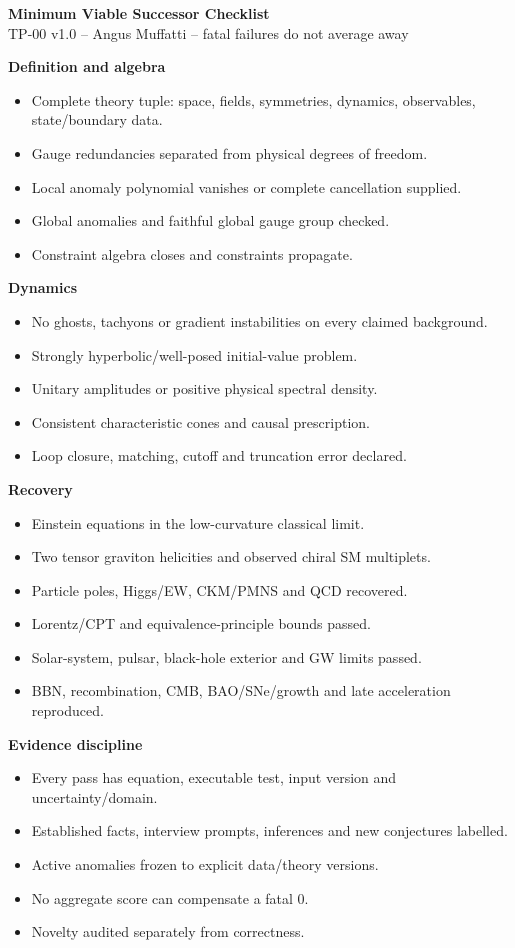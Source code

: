 \documentclass[9pt,a4paper]{article}
\begin{document}
\begin{center}{\Large\bfseries Minimum Viable Successor Checklist}\\[1mm]
{\small TP-00 v1.0 -- Angus Muffatti -- fatal failures do not average away}\end{center}
\begin{minipage}[t]{.48\linewidth}
\textbf{Definition and algebra}
\begin{itemize}
\item Complete theory tuple: space, fields, symmetries, dynamics, observables, state/boundary data.
\item Gauge redundancies separated from physical degrees of freedom.
\item Local anomaly polynomial vanishes or complete cancellation supplied.
\item Global anomalies and faithful global gauge group checked.
\item Constraint algebra closes and constraints propagate.
\end{itemize}
\textbf{Dynamics}
\begin{itemize}
\item No ghosts, tachyons or gradient instabilities on every claimed background.
\item Strongly hyperbolic/well-posed initial-value problem.
\item Unitary amplitudes or positive physical spectral density.
\item Consistent characteristic cones and causal prescription.
\item Loop closure, matching, cutoff and truncation error declared.
\end{itemize}
\end{minipage}\hfill
\begin{minipage}[t]{.48\linewidth}
\textbf{Recovery}
\begin{itemize}
\item Einstein equations in the low-curvature classical limit.
\item Two tensor graviton helicities and observed chiral SM multiplets.
\item Particle poles, Higgs/EW, CKM/PMNS and QCD recovered.
\item Lorentz/CPT and equivalence-principle bounds passed.
\item Solar-system, pulsar, black-hole exterior and GW limits passed.
\item BBN, recombination, CMB, BAO/SNe/growth and late acceleration reproduced.
\end{itemize}
\textbf{Evidence discipline}
\begin{itemize}
\item Every pass has equation, executable test, input version and uncertainty/domain.
\item Established facts, interview prompts, inferences and new conjectures labelled.
\item Active anomalies frozen to explicit data/theory versions.
\item No aggregate score can compensate a fatal 0.
\item Novelty audited separately from correctness.
\end{itemize}
\end{minipage}
\vfill
\noindent{}
\end{document}
